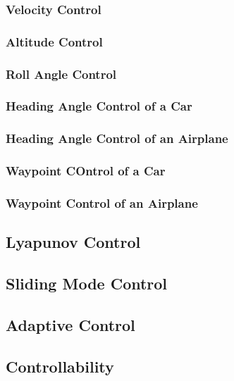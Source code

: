 \subsubsection{Velocity Control}

\subsubsection{Altitude Control}

\subsubsection{Roll Angle Control}

\subsubsection{Heading Angle Control of a Car}

\subsubsection{Heading Angle Control of an Airplane}

\subsubsection{Waypoint COntrol of a Car}

\subsubsection{Waypoint Control of an Airplane}

\subsection{Lyapunov Control}

\subsection{Sliding Mode Control}

\subsection{Adaptive Control}

\subsection{Controllability}

